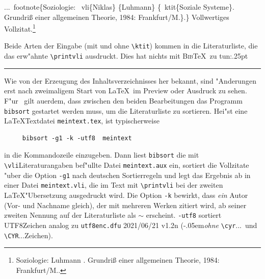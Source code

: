 \documentclass[12pt,a4paper]{article}
\newcommand{\pdfko}[1]{\kern #1pt
                              \rule[-0.4ex]{0.8pt}{0ex}\kern -0.8pt
                          \strut\ignorespaces}%
\newcommand{\pbs}{\string\ \unskip}
\newcommand{\bs}{\protect\pbs}
\begin{document}
\Doppelbox
{...\bs footnote\{Soziologie:
 \bs vli\{Niklas\} \{Luhmann\} \{\bs ktit\{Soziale Systeme\}. 
 \\ Grundriß einer allgemeinen Theorie, 1984: Frankfurt/M.\}.\}
}
{Vollwertiges Vollzitat.\footnote{Soziologie:
  {Luhmann} {. Grundriß einer 
 allgemeinen Theorie, 1984: Frankfurt/M.}.}
}

\vfill\noindent 
Beide Arten der Eingabe (mit und ohne \verb|\ktit|) kommen in die 
Literaturliste, die das erw"ahnte \verb|\printvli| ausdruckt. Dies hat
nichts mit \textsc{Bib}\TeX\ zu tun:\pdfko{.25}

 {\renewcommand{\gvlititlename}{Literatur \hfill \normalfont\small\raisebox{.45ex}{\texttt{\bs printvli \ \%druckt "Uberschrift und Liste\%}}}
  \printvli}
 
 \vspace{1ex}\noindent
 Wie von der Erzeugung des Inhaltsverzeichnisses her bekannt, sind
 "Anderungen erst nach zweimaligem Start von \LaTeX\ im Preview oder
 Ausdruck zu sehen. F"ur \BibArts\ gilt au\hyss erdem, dass zwischen den beiden
 Bearbeitungen das Programm \hspace{.05em}\verb|bibsort| \hspace{.05em}gestartet werden muss, um die
 Literaturliste zu sortieren. Hei"st eine \LaTeX\hy Textdatei
 \hspace{.075em}\verb|meintext.tex|\hspace{.05em}, ist typischerweise
 
 \vspace{-.5ex}
 \begin{verbatim} 
     bibsort -g1 -k -utf8  meintext
 \end{verbatim}

 \vspace{-3.25ex}\noindent
 in die Kommandozeile einzugeben. Dann liest \verb|bibsort| die mit
 \verb|\vli|\hy Literaturangaben bef"ullte Datei \verb|meintext.aux| ein,
 sortiert die Vollzitate "uber die Option \verb|-g1| \hspace{.1em}nach
 deutschen Sortierregeln und legt das Ergebnis ab in einer Datei
 \verb|meintext.vli|, die im Text mit \verb|\printvli| bei der zweiten
 \LaTeX\hy "Ubersetzung ausgedruckt wird. Die Option \verb|-k|
 \hspace{.2em}bewirkt, dass \textit{ein} Autor (Vor- und Nachname gleich),
 der mit mehreren Werken zitiert wird, ab seiner zweiten Nennung auf der
 Literaturliste als $\sim$ erscheint. \verb|-utf8| \hspace{.2em}sortiert
 UTF8\hy Zeichen analog zu \verb|utf8enc.dfu| 2021/06/21 v1.2n
 (\kern-.05em\textit{ohne} \verb|\cyr|...\ und \verb|\CYR|...\hy Zeichen).
\end{document}
